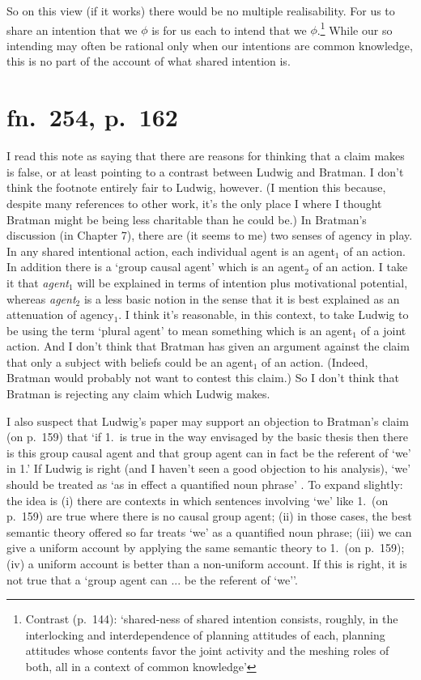 \documentclass[12pt,letterpaper]{extarticle}
\begin{document}
So on this view (if it works) there would be no multiple realisability.
For us to share an intention that we $\phi$ is for us each to intend that we $\phi$.\footnote{
Contrast  (p.\ 144): `shared-ness of shared intention consists, roughly, in the interlocking and interdependence of planning attitudes of each, planning attitudes whose contents favor the joint activity and the meshing roles of both, all in a context of common knowledge'
}
While our so intending may often be rational only when our intentions are common knowledge, this is no part of the account of what shared intention is.





\section{fn.\ 254, p.\ 162}
I read this note as saying that there are reasons for thinking that a claim \citet{ludwig_collective_2007} makes is false, or at least pointing to a contrast between Ludwig and Bratman.
I don't think the footnote entirely fair to Ludwig, however.
(I mention this because, despite many references to other work, it's the only place I where I thought Bratman might be being less charitable than he could be.)
In Bratman's discussion (in Chapter 7), there are (it seems to me) two senses of agency in play.
In any shared intentional action, each individual agent is an agent$_1$ of an action.
In addition there is a `group causal agent' which is an agent$_2$ of an action.
I take it that \emph{agent$_1$} will be explained in terms of intention plus motivational potential, whereas \emph{agent$_2$} is a less basic notion in the sense that it is best explained as an attenuation of agency$_1$.
I think it's reasonable, in this context, to take Ludwig to be using the term `plural agent' to mean something which is an agent$_1$ of a joint action.
And I don't think that Bratman has given an argument against the claim that only a subject with beliefs could be an agent$_1$ of an action.
(Indeed, Bratman would probably not want to contest this claim.)
So I don't think that Bratman is rejecting any claim which Ludwig makes.

I also suspect that Ludwig's paper may support an objection to Bratman's claim (on p.\ 159) that `if 1.\ is true in the way envisaged by the basic thesis then there is this group causal agent and that group agent can in fact be the referent of `we' in 1.'
If Ludwig is right (and I haven't seen a good objection to his analysis), `we' should be treated as `as in effect a quantified noun phrase' \citep[p.\ 364]{ludwig_collective_2007}.
To expand slightly: the idea is (i) there are contexts in which sentences involving `we' like 1.\ (on p.\ 159) are true where there is no causal group agent; (ii) in those cases, the best semantic theory offered so far treats `we' as a quantified noun phrase; (iii) we can give a uniform account by applying the same semantic theory to 1.\ (on p.\ 159); (iv) a uniform account is better than a non-uniform account.
If this is right, it is not true that a `group agent can ... be the referent of `we''.
\end{document}
